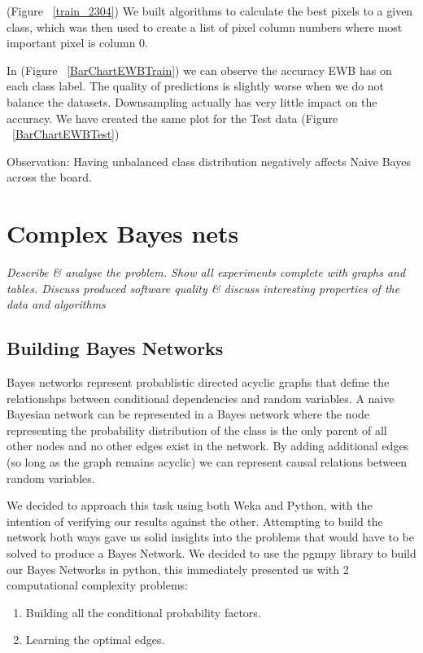\documentclass[11pt]{article}
\begin{document}
\par
(Figure ~\ref{train_2304})
We built algorithms to calculate the best pixels to a given class, which was then used to create
a list of pixel column numbers where most important pixel is column 0.
\par
In (Figure ~\ref{BarChartEWBTrain}) we can observe the accuracy EWB has on each class label. The
quality of predictions is slightly worse when we do not balance the datasets. Downsampling actually
has very little impact on the accuracy. We have created the same plot for the 
Test data (Figure ~\ref{BarChartEWBTest})
\par
Observation: Having unbalanced class distribution negatively affects Naive Bayes across the board.

\pagebreak

\section{Complex Bayes nets}
\par
\emph{Describe \& analyse the problem. Show all experiments complete with graphs and tables. Discuss produced software quality \& discuss interesting properties of the data and algorithms}

\subsection{Building Bayes Networks}
Bayes networks represent probablistic directed acyclic graphs that define the relationshps between conditional dependencies and random variables.
A naive Bayesian network can be represented in a Bayes network where the node representing the probability distribution of the class is the only parent of all other nodes and no other edges exist in the network. 
By adding additional edges (so long as the graph remains acyclic) we can represent causal relations between random variables.
\par
We decided to approach this task using both Weka and Python, with the intention of verifying our results against the other.
Attempting to build the network both ways gave us solid insights into the problems that would have to be solved to produce a Bayes Network.
We decided to use the pgmpy library to build our Bayes Networks in python, this immediately presented us with 2 computational complexity problems:
\begin{enumerate}
    \item Building all the conditional probability factors.
    \item Learning the optimal edges.
\end{enumerate}
\end{document}

